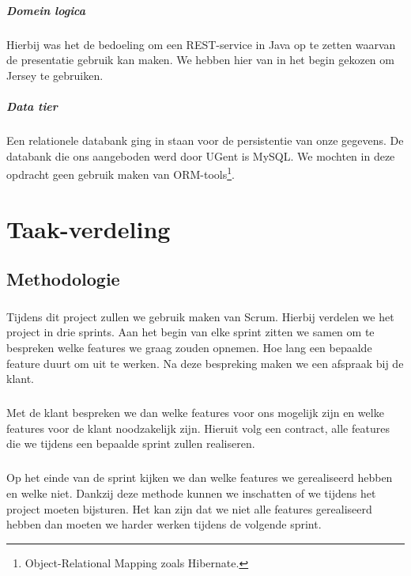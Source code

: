 \documentclass[pdftex,a4paper,12pt,twoside]{report}
\begin{document}
\paragraph{Domein logica}
Hierbij was het de bedoeling om een REST-service in Java op te zetten waarvan de presentatie gebruik kan maken. We hebben hier van in het begin gekozen om Jersey te gebruiken.

\paragraph{Data tier}
Een relationele databank ging in staan voor de persistentie van onze gegevens. De databank die ons aangeboden werd door UGent is MySQL. We mochten in deze opdracht geen gebruik maken van ORM-tools\footnote{Object-Relational Mapping zoals Hibernate.}. 

\chapter{Taak-verdeling}

\section{Methodologie}
\paragraph{}
Tijdens dit project zullen we gebruik maken van Scrum. Hierbij verdelen we het project in drie sprints. Aan het begin van elke sprint zitten we samen om te bespreken welke features we graag zouden opnemen. Hoe lang een bepaalde feature duurt om uit te werken. Na deze bespreking maken we een afspraak bij de klant.

\paragraph{}
Met de klant bespreken we dan welke features voor ons mogelijk zijn en welke features voor de klant noodzakelijk zijn. Hieruit volg een contract, alle features die we tijdens een bepaalde sprint zullen realiseren.

\paragraph{}
Op het einde van de sprint kijken we dan welke features we gerealiseerd hebben en welke niet. Dankzij deze methode kunnen we inschatten of we tijdens het project moeten bijsturen. Het kan zijn dat we niet alle features gerealiseerd hebben dan moeten we harder werken tijdens de volgende sprint.
\end{document}
